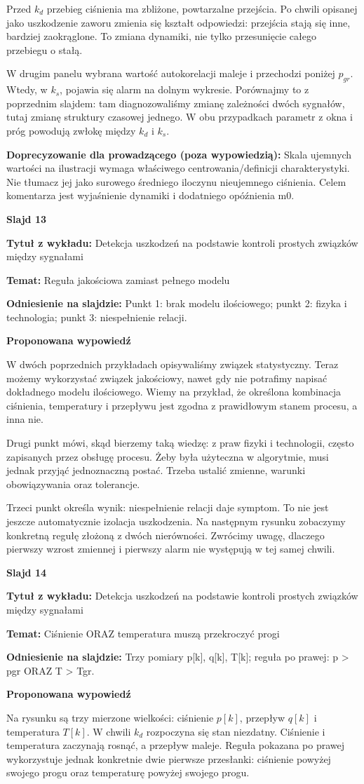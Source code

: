 \documentclass[a4paper,11pt]{article}
\newcommand{\NumerSlajdu}{1}
\newcommand{\Komentarz}[3]{%
  \gdef\NumerSlajdu{#1}%
  {\Large\bfseries Slajd #1\par}\smallskip
  \textbf{Tytuł z wykładu:} #2\par
  \textbf{Temat:} #3\par\medskip
}
\begin{document}
Przed $k_d$ przebieg ciśnienia ma zbliżone, powtarzalne przejścia. Po chwili opisanej jako uszkodzenie zaworu zmienia się kształt odpowiedzi: przejścia stają się inne, bardziej zaokrąglone. To zmiana dynamiki, nie tylko przesunięcie całego przebiegu o stałą.

W drugim panelu wybrana wartość autokorelacji maleje i przechodzi poniżej $p_{gr}$. Wtedy, w $k_s$, pojawia się alarm na dolnym wykresie. Porównajmy to z poprzednim slajdem: tam diagnozowaliśmy zmianę zależności dwóch sygnałów, tutaj zmianę struktury czasowej jednego. W obu przypadkach parametr z okna i próg powodują zwłokę między $k_d$ i $k_s$.

{\small\color{black!65}\textbf{Doprecyzowanie dla prowadzącego (poza wypowiedzią):} Skala ujemnych wartości na ilustracji wymaga właściwego centrowania/definicji charakterystyki. Nie tłumacz jej jako surowego średniego iloczynu nieujemnego ciśnienia. Celem komentarza jest wyjaśnienie dynamiki i dodatniego opóźnienia m0.\par}
\clearpage

\Komentarz{13}{Detekcja uszkodzeń na podstawie kontroli prostych związków między sygnałami}{Reguła jakościowa zamiast pełnego modelu}
{\small\color{black!65}\textbf{Odniesienie na slajdzie:} Punkt 1: brak modelu ilościowego; punkt 2: fizyka i technologia; punkt 3: niespełnienie relacji.\par}
\medskip
\textbf{Proponowana wypowiedź}\par
W dwóch poprzednich przykładach opisywaliśmy związek statystyczny. Teraz możemy wykorzystać związek jakościowy, nawet gdy nie potrafimy napisać dokładnego modelu ilościowego. Wiemy na przykład, że określona kombinacja ciśnienia, temperatury i przepływu jest zgodna z prawidłowym stanem procesu, a inna nie.

Drugi punkt mówi, skąd bierzemy taką wiedzę: z praw fizyki i technologii, często zapisanych przez obsługę procesu. Żeby była użyteczna w algorytmie, musi jednak przyjąć jednoznaczną postać. Trzeba ustalić zmienne, warunki obowiązywania oraz tolerancje.

Trzeci punkt określa wynik: niespełnienie relacji daje symptom. To nie jest jeszcze automatycznie izolacja uszkodzenia. Na następnym rysunku zobaczymy konkretną regułę złożoną z dwóch nierówności. Zwrócimy uwagę, dlaczego pierwszy wzrost zmiennej i pierwszy alarm nie występują w tej samej chwili.
\clearpage

\Komentarz{14}{Detekcja uszkodzeń na podstawie kontroli prostych związków między sygnałami}{Ciśnienie ORAZ temperatura muszą przekroczyć progi}
{\small\color{black!65}\textbf{Odniesienie na slajdzie:} Trzy pomiary p[k], q[k], T[k]; reguła po prawej: p > pgr ORAZ T > Tgr.\par}
\medskip
\textbf{Proponowana wypowiedź}\par
Na rysunku są trzy mierzone wielkości: ciśnienie $p[k]$, przepływ $q[k]$ i temperatura $T[k]$. W chwili $k_d$ rozpoczyna się stan niezdatny. Ciśnienie i temperatura zaczynają rosnąć, a przepływ maleje. Reguła pokazana po prawej wykorzystuje jednak konkretnie dwie pierwsze przesłanki: ciśnienie powyżej swojego progu oraz temperaturę powyżej swojego progu.
\end{document}
